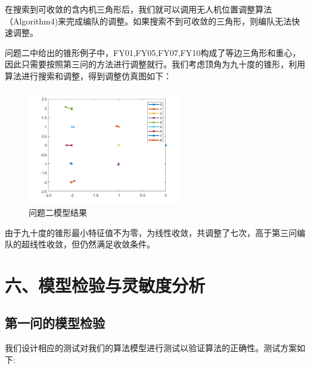 \documentclass{my_paper}
\begin{document}
在搜索到可收敛的含内机三角形后，我们就可以调用无人机位置调整算法（Algorithm4)来完成编队的调整。如果搜索不到可收敛的三角形，则编队无法快速调整。

问题二中给出的锥形例子中，FY01,FY05,FY07,FY10构成了等边三角形和重心，因此只需要按照第三问的方法进行调整就行。我们考虑顶角为九十度的锥形，利用算法进行搜索和调整，得到调整仿真图如下：

\begin{figure}[H]
    \centering
    \includegraphics[width=0.6\textwidth]{four3}
    \caption{问题二模型结果} 
\end{figure}

由于九十度的锥形最小特征值不为零，为线性收敛，共调整了七次，高于第三问编队的超线性收敛，但仍然满足收敛条件。

\section{六、模型检验与灵敏度分析}
\subsection{第一问的模型检验}
我们设计相应的测试对我们的算法模型进行测试以验证算法的正确性。测试方案如下:
\end{document}
